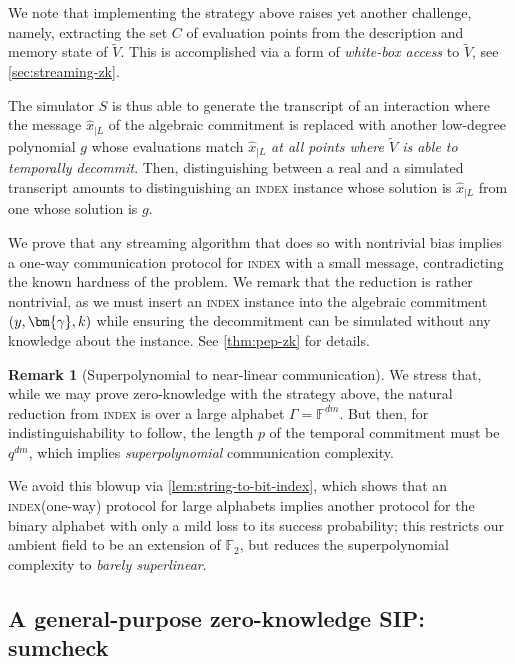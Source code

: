 \documentclass[a4paper,UKenglish,cleveref, autoref, thm-restate]{lipics-v2021}
\theoremstyle{definition}
\newtheorem{remark}[theorem]{Remark}
\newcommand{\field}{\mathbb{F}}
\newcommand{\indexproblem}{\normalfont\textsc{index}\xspace}
\newcommand{\pcommitlength}{p}
\newcommand{\pcommitstring}{y}
\newcommand{\dimension}{m}
\newcommand{\degree}{d}
\newcommand{\fieldsize}{q}
\renewcommand{\line}{L}
\newcommand{\alphabet}{\Gamma}
\def\fe#1{
    \ifnum#1=1
        \alpha
    \else
    \ifnum#1=2
        \beta
    \else
    \ifnum#1=3
        \gamma
    \fi\fi\fi
}
\begin{document}
    We note that implementing the strategy above raises yet another challenge, namely, extracting the set $C$ of evaluation points from the description and memory state of $\widetilde V$. This is accomplished via a form of \emph{white-box access} to $\widetilde V$, see \cref{sec:streaming-zk}.
    
     The simulator $S$ is thus able to generate the transcript of an interaction where the message $\hat x_{|\line}$ of the algebraic commitment is replaced with another low-degree polynomial $g$ whose evaluations match $\hat x_{|\line}$ \emph{at all points where $\widetilde V$ is able to temporally decommit}. Then, distinguishing between a real and a simulated transcript amounts to distinguishing an \indexproblem instance whose solution is $\hat x_{|\line}$ from one whose solution is $g$.
     
     We prove that any streaming algorithm that does so with nontrivial bias implies a one-way communication protocol for \indexproblem with a small message, contradicting the known hardness of the problem. We remark that the reduction is rather nontrivial, as we must insert an \indexproblem instance into the algebraic commitment $(\pcommitstring, \bm{\fe3}, k)$ while ensuring the decommitment can be simulated without any knowledge about the instance. See \cref{thm:pep-zk} for details.
     
     \begin{remark}[Superpolynomial to near-linear communication]
         We stress that, while we may prove zero-knowledge with the strategy above, the natural reduction from \indexproblem is over a large alphabet $\alphabet = \field^{\degree\dimension}$. But then, for indistinguishability to follow, the length $\pcommitlength$ of the temporal commitment must be $\fieldsize^{\degree\dimension}$, which implies \emph{superpolynomial} communication complexity.
         
         We avoid this blowup via \cref{lem:string-to-bit-index}, which shows that an \indexproblem (one-way) protocol for large alphabets implies another protocol for the binary alphabet with only a mild loss to its success probability; this restricts our ambient field to be an extension of $\field_2$, but reduces the superpolynomial complexity to \emph{barely superlinear}.
     \end{remark}
     
    
\subsection{A general-purpose zero-knowledge SIP: sumcheck}
\label{sec-to:sumcheck}
\end{document}

